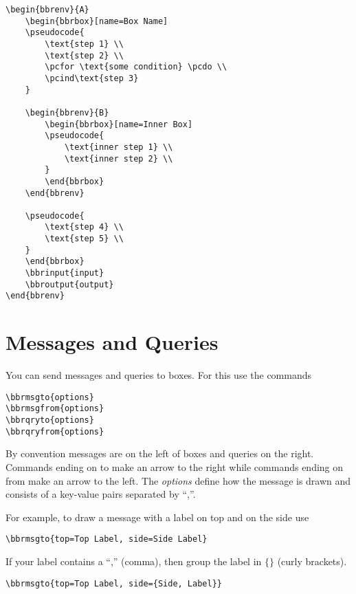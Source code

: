 \documentclass[a4paper]{report}
\begin{document}
\begin{lstlisting}
\begin{bbrenv}{A}
	\begin{bbrbox}[name=Box Name]
	\pseudocode{
		\text{step 1} \\
		\text{step 2} \\
		\pcfor \text{some condition} \pcdo \\
		\pcind\text{step 3} 
	}

	\begin{bbrenv}{B}
		\begin{bbrbox}[name=Inner Box]
		\pseudocode{
			\text{inner step 1} \\
			\text{inner step 2} \\
		}
		\end{bbrbox}
	\end{bbrenv}

	\pseudocode{
		\text{step 4} \\
		\text{step 5} \\
	}
	\end{bbrbox}
	\bbrinput{input}
	\bbroutput{output}
\end{bbrenv}
\end{lstlisting}

\section{Messages and Queries}

You can send messages and queries to boxes. For this use the commands 
\begin{lstlisting}
\bbrmsgto{options}
\bbrmsgfrom{options}
\bbrqryto{options}
\bbrqryfrom{options}
\end{lstlisting}
By convention messages are on the left of boxes and queries on the right. Commands ending on to
make an arrow to the right while commands ending on from make an arrow to the left. The \emph{options}
define how the message is drawn and consists of a key-value pairs separated by \enquote{,}.

For example, to draw a message with a label on top and on the side use
\begin{lstlisting}
\bbrmsgto{top=Top Label, side=Side Label}
\end{lstlisting}
If your label contains a \enquote{,} (comma), then group the label in $\{\}$ (curly brackets).
\begin{lstlisting}
\bbrmsgto{top=Top Label, side={Side, Label}}
\end{lstlisting}
\end{document}
